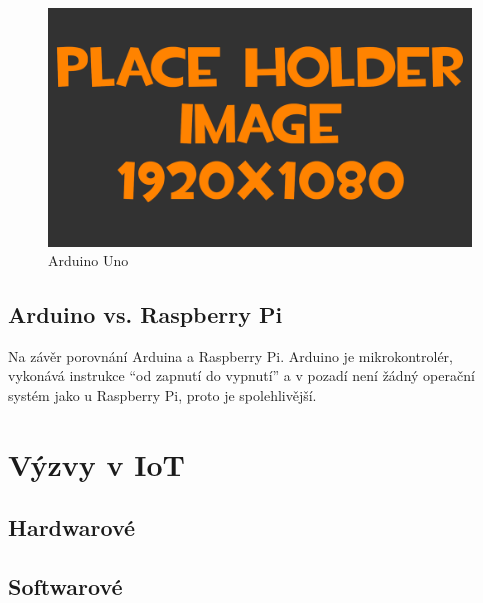 \begin{figure}[h!]
	\centering
	\includegraphics[width=\textwidth]{pictures/placeHolderFHD.png}
    	\caption{Arduino Uno}
   	\label{fig:arduinoUno}
\end{figure}	

\subsection{Arduino vs. Raspberry Pi}
Na závěr porovnání Arduina a Raspberry Pi. Arduino je mikrokontrolér, vykonává instrukce “od zapnutí do vypnutí” a v pozadí není žádný operační systém jako u Raspberry Pi, proto je spolehlivější.


\section{Výzvy v IoT}
\subsection{Hardwarové}
\subsection{Softwarové}
